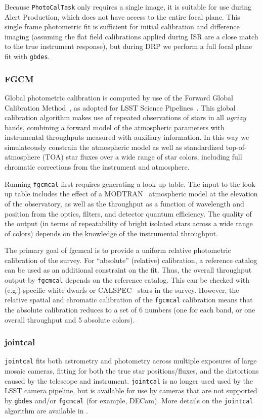 Because \texttt{PhotoCalTask} only requires a single image, it is suitable for use during Alert Production, which does not have access to the entire focal plane.
This single frame photometric fit is sufficient for initial calibration and difference imaging (assuming the flat field calibrations applied during ISR are a close match to the true instrument response), but during DRP we perform a full focal plane fit with \texttt{gbdes}.

\subsubsection{FGCM}
\label{sec:fgcmcal}

Global photometric calibration is computed by use of the Forward Global Calibration Method~\citep[FGCM][]{2018AJ....155...41B}, as adopted for LSST Science Pipelines~\citep{SITCOMTN-086}.
This global calibration algorithm makes use of repeated observations of stars in all $ugrizy$ bands, combining a forward model of the atmospheric parameters with instrumental throughputs measured with auxiliary information.
In this way we simulateously constrain the atmospheric model as well as standardized top-of-atmosphere (TOA) star fluxes over a wide range of star colors, including full chromatic corrections from the instrument and atmosphere.

Running \texttt{fgcmcal} first requires generating a look-up table.
The input to the look-up table includes the effect of a MODTRAN~\citep{10.1117/12.366388} atmospheric model at the elevation of the observatory, as well as the throughput as a function of wavelength and position from the optics, filters, and detector quantum efficiency.
The quality of the output (in terms of repeatability of bright isolated stars across a wide range of colors) depends on the knowledge of the instrumental throughput.

The primary goal of fgcmcal is to provide a uniform relative photometric calibration of the survey.
For ``absolute'' (relative) calibration, a reference catalog can be used as an additional constraint on the fit.
Thus, the overall throughput output by \texttt{fgcmcal} depends on the reference catalog.
This can be checked with (e.g.) specific white dwarfs or CALSPEC~\citep{2007ASPC..364..315B} stars in the survey.
However, the relative spatial and chromatic calibration of the \texttt{fgcmcal} calibration means that the absolute calibration reduces to a set of 6 numbers (one for each band, or one overall throughput and 5 absolute colors).

\subsubsection{jointcal}

\texttt{jointcal} fits both astrometry and photometry across multiple exposures of large mosaic cameras, fitting for both the true star positions/fluxes, and the distortions caused by the telescope and instrument.
\texttt{jointcal} is no longer used used by the LSST camera pipeline, but is available for use by cameras that are not supported by \texttt{gbdes} and/or \texttt{fgcmcal} (for example, DECam).
More details on the \texttt{jointcal} algorithm are available in \citep{DMTN-036}.
